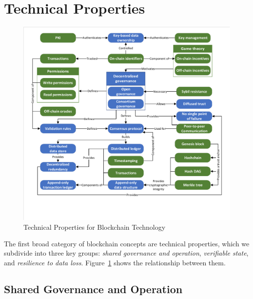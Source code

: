 
\section{Technical Properties}
\label{sec:blockchain}

\begin{figure}
	\centering
	\includegraphics[page=2,width=\columnwidth]{figures/grounded-theory-main}
	\caption{Technical Properties for Blockchain Technology}
	\label{fig:technical-properties}
\end{figure}

The first broad category of blockchain concepts are technical properties, which we subdivide into three key groups: \textit{shared governance and operation}, \textit{verifiable state}, and 
\textit{resilience to data loss}. Figure~\ref{fig:technical-properties} shows the relationship between them.

\subsection{Shared Governance and Operation}
\label{sec:sharedgov}


